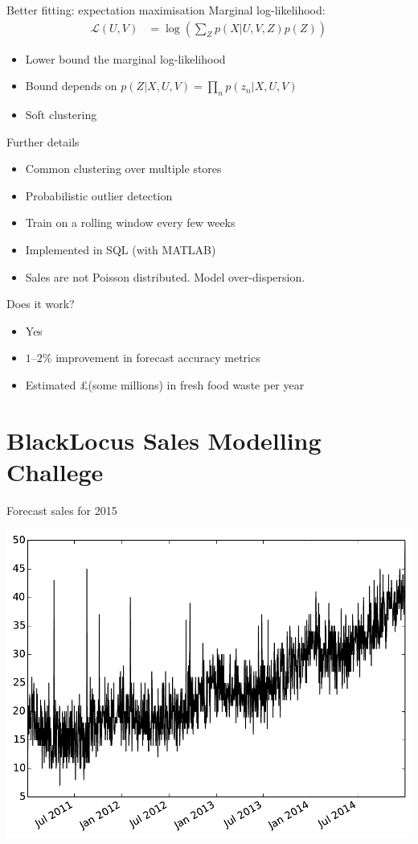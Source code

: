 \documentclass{beamer}
\begin{document}
\begin{frame}{Better fitting: expectation maximisation}
 Marginal log-likelihood:
 \begin{align}
  \mathcal{L}(U,V) &= \log\left(\sum_Z p(X|U,V,Z) p(Z)\right)
 \end{align}
 \begin{itemize}
  \item Lower bound the marginal log-likelihood
  \item Bound depends on $p(Z|X,U,V) = \prod_n p(z_n|X,U,V)$
  \item Soft clustering
 \end{itemize}
\end{frame}

\begin{frame}{Further details}
 \begin{itemize}
  \item Common clustering over multiple stores
  \item Probabilistic outlier detection
  \item Train on a rolling window every few weeks
  \item Implemented in SQL (with MATLAB)
  \item Sales are not Poisson distributed. Model over-dispersion.
 \end{itemize}
\end{frame}

\begin{frame}{Does it work?}
 \begin{itemize}
  \item Yes
  \item $1$--$2\%$ improvement in forecast accuracy metrics
  \item Estimated \pounds(some millions) in fresh food waste per year
 \end{itemize}
\end{frame}

\section{BlackLocus Sales Modelling Challege}

\begin{frame}{Forecast sales for 2015}
 \begin{center}
  \includegraphics[width=0.8\columnwidth]{sales.pdf}
 \end{center}
\end{frame}
\end{document}
